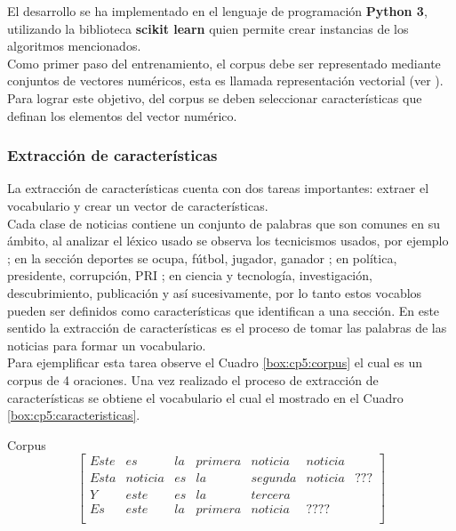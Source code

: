 El desarrollo se ha implementado en el lenguaje de programación \textbf{Python 3}, utilizando la biblioteca \textbf{scikit learn} quien permite crear instancias de los algoritmos mencionados.\\

Como primer paso del entrenamiento, el corpus debe ser representado mediante conjuntos de vectores numéricos, esta es llamada representación vectorial (ver ). Para lograr este objetivo, del corpus se deben seleccionar características que definan los elementos del vector numérico.\\

\subsubsection{Extracción de características}

La extracción de características cuenta con dos tareas importantes: extraer el vocabulario y crear un vector de características.\\

Cada clase de noticias contiene un conjunto de palabras que son comunes en su ámbito, al analizar el léxico usado se observa los tecnicismos usados, por ejemplo ; en la sección deportes se ocupa, fútbol, jugador, ganador ; en política, presidente, corrupción, PRI ; en ciencia y tecnología, investigación, descubrimiento, publicación y así sucesivamente, por lo tanto estos vocablos pueden ser definidos como características que identifican a una sección. En este sentido la extracción de características es el proceso de tomar las palabras de las noticias para formar un vocabulario.\\

Para ejemplificar esta tarea observe el Cuadro \ref{box:cp5:corpus} el cual es un corpus de 4 oraciones. Una vez realizado el proceso de extracción de características se obtiene el vocabulario el cual el mostrado en el Cuadro \ref{box:cp5:caracteristicas}.\\

\begin{mygraybox}[label={box:cp5:corpus}]{Corpus} 
\begin{equation*}
\begin{bmatrix}
Este&es&la&primera&noticia&noticia\\
Esta&noticia&es&la&segunda&noticia&???\\
Y&este&es&la&tercera\\
Es&este&la&primera&noticia&????\\
\end{bmatrix}
\end{equation*}
\end{mygraybox}

